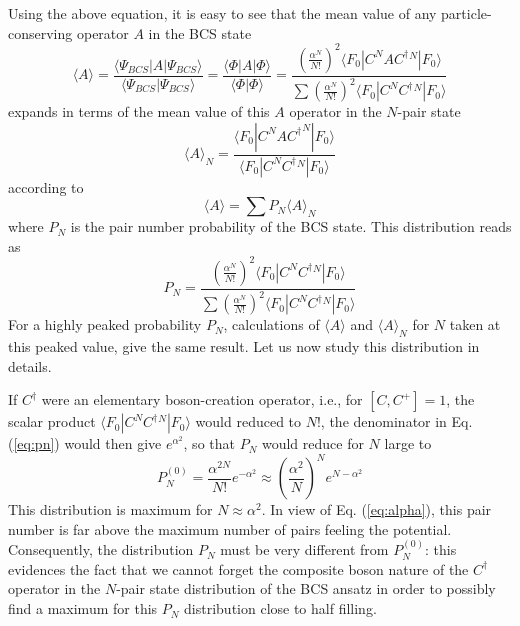 \documentclass[aps,prb,preprint,groupedaddress,amsmath]{revtex4-1}
\newcommand{\dg}{\ensuremath{\dagger}}
\begin{document}
Using the above equation, it is easy to see that the mean value of any particle-conserving operator $A$ in the BCS state
\begin{equation}
\langle{A}\rangle=\frac{\langle\Psi_{BCS}|A|\Psi_{BCS}{\rangle}}
{\langle\Psi_{BCS}|\Psi_{BCS}{\rangle}}=\frac{\langle\Phi|A|\Phi{\rangle}}
{\langle\Phi|\Phi{\rangle}}=\frac{\left(\frac{\alpha^N}{N!}\right)^2\langle{}F_0|{C}^NA{C^\dg}{}^N|F_0{\rangle}}
{\sum{\left(\frac{\alpha^{N}}{N!}\right)^2\langle{}F_0|{C}^N{C^\dg}{}^N|F_0\rangle}}
\end{equation}
 expands in terms of the mean value of this $A$ operator in the $N$-pair state
\begin{equation}
\langle{A}\rangle_N=\frac{\langle{}F_0|C^NA{C^\dg}^N|F_0{\rangle}}
{\langle{}F_0|{C}^N{{C}^\dg}{} ^N|F_0{\rangle}}\end{equation}
according to 
\begin{equation}
\langle{A}\rangle=\sum{P_N}\langle{A}\rangle_N
\end{equation}
where $P_N$ is the pair number probability of the BCS state. This distribution reads as 
\begin{equation}\label{eq:pn}
P_N=\frac{\left(\frac{\alpha^{N}}{N!}\right)^2\langle{}F_0|{C}^N{C^\dg}{}^N|F_0{\rangle}}
{\sum{\left(\frac{\alpha^{N}}{N!}\right)^2\langle{}F_0|{C}^N{C^\dg}{}^N|F_0\rangle}}
\end{equation} 
For a highly peaked probability $P_N$, calculations of $\langle{A}\rangle$ and $\langle{A}\rangle_N$ for $N$ taken at this peaked value, give the same result. Let us now study this distribution in details. 

If $C^\dg$ were an elementary boson-creation operator, i.e., for $[{C},{C}^+]=1$, the scalar product $\langle{}F_0|{C}^N{C^\dg}{}^N|F_0{\rangle}$ would reduced to $N!$, the denominator in Eq.(\ref{eq:pn}) would then give $e^{\alpha^2}$, so that $P_N$ would reduce for $N$ large to 
\begin{equation}
 P_N^{(0)}=\frac{\alpha^{2N}}{N!}e^{-\alpha^2}\approx\left(\frac{\alpha^2}{N}\right)^Ne^{N-\alpha^2}
\end{equation}
This distribution is maximum for $N\approx\alpha^2$. In view of  Eq. (\ref{eq:alpha}), this pair number is far above the maximum number of pairs feeling the potential. Consequently, the distribution $P_N$ must be very different from $P_N^{(0)}$: this evidences the fact that we cannot forget the composite boson nature of the $C^\dg$ operator in the $N$-pair state distribution of the BCS ansatz in order to possibly find a maximum for this $P_N$ distribution close to half filling. 
\end{document}
